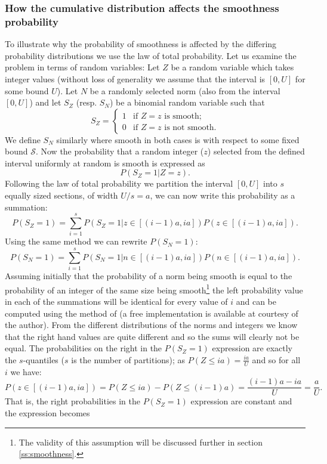 \documentclass[a4paper, 12pt, envcountsect, runningheads]{llncs}
\numberwithin{figure}{section}
\numberwithin{equation}{section}
\begin{document}
\subsubsection*{How the cumulative distribution affects the smoothness probability}
To illustrate why the probability of smoothness is affected by the differing probability distributions we use the law of total probability. Let us examine the problem in terms of random variables: Let $Z$ be a random variable which takes integer values (without loss of generality we assume that the interval is $[0,U]$ for some bound $U$). Let $N$ be a randomly selected norm (also from the interval $[0,U]$) and let $S_Z$ (resp. $S_N$) be a binomial random variable such that 
\begin{equation}
S_Z=\left\{\begin{array}{ll}
1 & \mbox{if }Z=z\mbox{ is smooth};\\
0 & \mbox{if }Z=z\mbox{ is not smooth}.
\end{array}\right.
\end{equation}
We define $S_N$ similarly where smooth in both cases is with respect to some fixed bound $\mathcal{S}$. Now the probability that a random integer ($z$) selected from the defined interval uniformly at random is smooth is expressed as $$P(S_Z=1| Z=z).$$ Following the law of total probability we partition the interval $[0,U]$ into $s$ equally sized sections, of width $U/s=a$, we can now write this probability as a summation: $$P(S_Z=1)=\sum_{i=1}^{s}P(S_Z=1| z\in[(i-1)a,ia])P(z\in[(i-1)a,ia]).$$ Using the same method we can rewrite $P(S_N=1)$: $$P(S_N=1)=\sum_{i=1}^{s}P(S_N=1| n\in[(i-1)a,ia])P(n\in[(i-1)a,ia]).$$
Assuming initially that the probability of a norm being smooth is equal to the probability of an integer of the same size being smooth\footnote{The validity of this assumption will be discussed further in section \ref{ss:smoothness}.} the left probability value in each of the summations will be identical for every value of $i$ and can be computed using the method of \cite{dan_psi_est} (a free implementation is available at \cite{dan_imp} courtesy of the author). From the different distributions of the norms and integers we know that the right hand values are quite different and so the sums will clearly not be equal. 
The probabilities on the right in the $P(S_Z=1)$ expression are exactly the $s$-quantiles ($s$ is the number of partitions); as $P(Z\leq ia)=\frac{ia}{U}$ and so for all $i$ we have: $$P(z\in[(i-1)a,ia])=P(Z\leq ia)-P(Z\leq (i-1)a)=\frac{(i-1)a-ia}{U}=\frac{a}{U}.$$ That is, the right probabilities in the $P(S_Z=1)$ expression are constant and the expression becomes 
\end{document}
